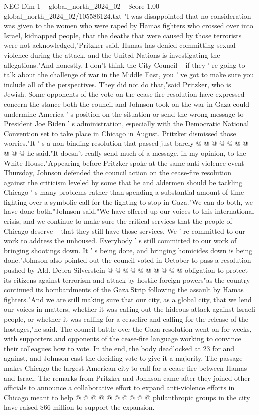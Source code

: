 \begin{textsample}{NEG Dim 1 – global\_north\_2024\_02 – Score 1.00 – global\_north\_2024\_02/105586124.txt}  \label{ex:f1_neg_180}
"I was disappointed that no consideration was given to the women who were raped by Hamas fighters who crossed over into Israel, kidnapped people, that the deaths that were caused by those terrorists were not acknowledged,"Pritzker said.
Hamas has denied committing sexual violence during the attack, and the United Nations is investigating the allegations."And honestly, I don't think the City Council -- if they ' re going to talk about the challenge of war in the Middle East, you ' ve got to make sure you include all of the perspectives.
They did not do that,"said Pritzker, who is Jewish.
Some opponents of the vote on the cease-fire resolution have expressed concern the stance both the council and Johnson took on the war in Gaza could undermine America ' s position on the situation or send the wrong message to President Joe Biden ' s administration, especially with the Democratic National Convention set to take place in Chicago in August.
Pritzker dismissed those worries."It ' s a non-binding resolution that passed just barely @ @ @ @ @ @ @ @ @ @ he said."It doesn't really send much of a message, in my opinion, to the White House."Appearing before Pritzker spoke at the same anti-violence event Thursday, Johnson defended the council action on the cease-fire resolution against the criticism leveled by some that he and aldermen should be tackling Chicago ' s many problems rather than spending a substantial amount of time fighting over a symbolic call for the fighting to stop in Gaza."We can do both, we have done both,"Johnson said."We have offered up our voices to this international crisis, and we continue to make sure the critical services that the people of Chicago deserve -- that they still have those services.
We ' re committed to our work to address the unhoused.
Everybody ' s still committed to our work of bringing shootings down.
It ' s being done, and bringing homicides down is being done."Johnson also pointed out the council voted in October to pass a resolution pushed by Ald.
Debra Silverstein @ @ @ @ @ @ @ @ @ @ obligation to protect its citizens against terrorism and attack by hostile foreign powers"as the country continued its bombardments of the Gaza Strip following the assault by Hamas fighters."And we are still making sure that our city, as a global city, that we lend our voices in matters, whether it was calling out the hideous attack against Israeli people, or whether it was calling for a ceasefire and calling for the release of the hostages,"he said.
The council battle over the Gaza resolution went on for weeks, with supporters and opponents of the cease-fire language working to convince their colleagues how to vote.
In the end, the body deadlocked at 23 for and against, and Johnson cast the deciding vote to give it a majority.
The passage makes Chicago the largest American city to call for a cease-fire between Hamas and Israel.
The remarks from Pritzker and Johnson came after they joined other officials to announce a collaborative effort to expand anti-violence efforts in Chicago meant to help @ @ @ @ @ @ @ @ @ @ philanthropic groups in the city have raised \$66 million to support the expansion.

\end{textsample}
